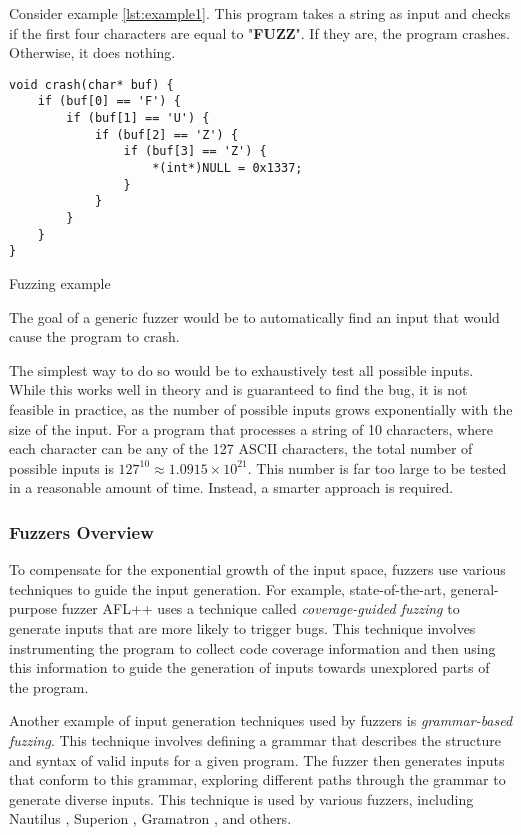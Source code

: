 Consider example \ref{lst:example1}. This program takes a string as input and checks if the first four characters are equal to "\textbf{FUZZ}". If they are, the program crashes. Otherwise, it does nothing.

\begin{listing}[htp]
	\centering
	\begin{minipage}{.6\linewidth}
		\begin{verbatim}
void crash(char* buf) {
	if (buf[0] == 'F') {
		if (buf[1] == 'U') {
			if (buf[2] == 'Z') {
				if (buf[3] == 'Z') {
					*(int*)NULL = 0x1337;
				}
			}
		}
	}
}
		\end{verbatim}
	\end{minipage}
	\caption{Fuzzing example}
	\label{lst:example1}
\end{listing}

The goal of a generic fuzzer would be to automatically find an input that would cause the program to crash.

The simplest way to do so would be to exhaustively test all possible inputs. While this works well in theory and is guaranteed to find the bug, it is not feasible in practice, as the number of possible inputs grows exponentially with the size of the input. For a program that processes a string of 10 characters, where each character can be any of the 127 ASCII characters, the total number of possible inputs is $127^{10} \approx 1.0915 \times 10^{21}$. This number is far too large to be tested in a reasonable amount of time. Instead, a smarter approach is required.

\subsubsection{Fuzzers Overview}

To compensate for the exponential growth of the input space, fuzzers use various techniques to guide the input generation. For example, state-of-the-art, general-purpose fuzzer AFL++ \cite{AFLplusplus-Woot20} uses a technique called \textit{coverage-guided fuzzing} to generate inputs that are more likely to trigger bugs. This technique involves instrumenting the program to collect code coverage information and then using this information to guide the generation of inputs towards unexplored parts of the program.

Another example of input generation techniques used by fuzzers is \textit{grammar-based fuzzing}. This technique involves defining a grammar that describes the structure and syntax of valid inputs for a given program. The fuzzer then generates inputs that conform to this grammar, exploring different paths through the grammar to generate diverse inputs. This technique is used by various fuzzers, including Nautilus \cite{nautilus-grammar-fuzzer}, Superion \cite{superion-grammar-fuzzer}, Gramatron \cite{gramatron-effective-grammar-aware-fuzzing}, and others.

